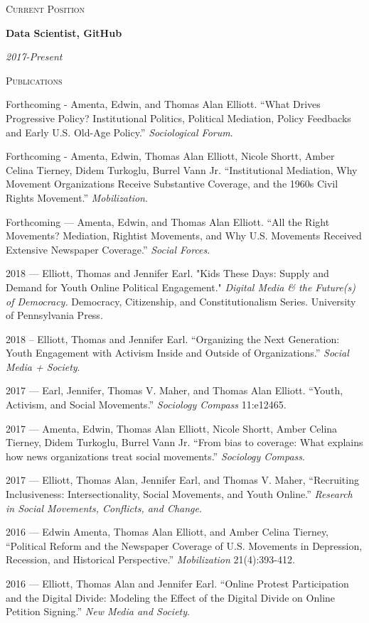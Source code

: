 \documentclass[11pt]{article}
\newcommand{\sectionheader}[1]{
{\Large
\textsc{#1}}
}
\newcommand{\resumeitem}[2]{
\begin{minipage}{0.7\textwidth}
\begin{flushleft}
\textbf{#1}
\end{flushleft}
\end{minipage}
\begin{minipage}{0.3\textwidth}
\begin{flushright}
\emph{#2}
\end{flushright}
\end{minipage}
\hangindent=0.05\textwidth
}
\begin{document}
\sectionheader{Current Position}

\resumeitem{Data Scientist, GitHub}{2017-Present}


\sectionheader{Publications}

Forthcoming - Amenta, Edwin, and Thomas Alan Elliott. ``What Drives Progressive Policy? Institutional Politics, Political Mediation, Policy Feedbacks and Early U.S. Old-Age Policy.'' \textit{Sociological Forum}. 

Forthcoming - Amenta, Edwin, Thomas Alan Elliott, Nicole Shortt, Amber Celina Tierney, Didem Turkoglu, Burrel Vann Jr. ``Institutional Mediation, Why Movement Organizations Receive Substantive Coverage, and the 1960s Civil Rights Movement.'' \textit{Mobilization}.

Forthcoming --- Amenta, Edwin, and Thomas Alan Elliott. ``All the Right Movements?
Mediation, Rightist Movements, and Why U.S. Movements Received Extensive Newspaper Coverage.'' \textit{Social Forces}. 

2018 --- Elliott, Thomas and Jennifer Earl. "Kids These Days: Supply and Demand for Youth Online Political Engagement." \textit{Digital Media \& the Future(s) of Democracy.} Democracy, Citizenship, and Constitutionalism Series. University of Pennsylvania Press.

2018 -- Elliott, Thomas and Jennifer Earl. ``Organizing the Next Generation: Youth Engagement with Activism Inside and Outside of Organizations.'' \textit{Social Media + Society}.

2017 --- Earl, Jennifer, Thomas V. Maher, and Thomas Alan Elliott. ``Youth, Activism, and Social Movements.'' \textit{Sociology Compass} 11:e12465.

2017 --- Amenta, Edwin, Thomas Alan Elliott, Nicole Shortt, Amber Celina Tierney, Didem Turkoglu, Burrel Vann Jr. ``From bias to coverage: What explains how news organizations treat social movements.'' \textit{Sociology Compass}. 

2017 --- Elliott, Thomas Alan, Jennifer Earl, and Thomas V. Maher, ``Recruiting Inclusiveness: Intersectionality, Social Movements, and Youth Online.'' \textit{Research in Social Movements, Conflicts, and Change}.

2016 --- Edwin Amenta, Thomas Alan Elliott, and Amber Celina Tierney, ``Political Reform and the Newspaper Coverage of U.S. Movements in Depression, Recession, and Historical Perspective.'' \textit{Mobilization} 21(4):393-412.

2016 --- Elliott, Thomas Alan and Jennifer Earl. ``Online Protest Participation and the Digital Divide: Modeling the Effect of the Digital Divide on Online Petition Signing.'' \textit{New Media and Society}.
\end{document}
